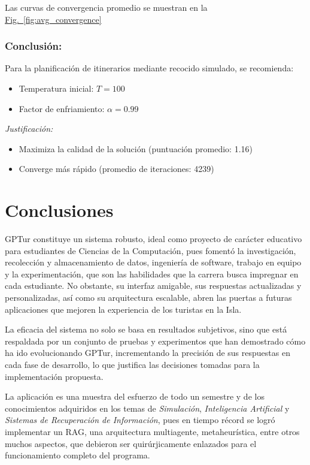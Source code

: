 \documentclass[10pt]{llncs}
\newcommand{\figref}[1]{\hyperref[#1]{Fig.~\ref*{#1}}}
\begin{document}
\begin{remark}
Las curvas de convergencia promedio se muestran en la {\figref{fig:avg_convergence}}
\end{remark}

\subsubsection{Conclusión:}
Para la planificación de itinerarios mediante recocido simulado, se recomienda:


\begin{itemize}
    \item Temperatura inicial: $T = 100$
    \item Factor de enfriamiento: $\alpha = 0.99$
\end{itemize}

\textit{Justificación:}
\begin{itemize}
    \item Maximiza la calidad de la solución (puntuación promedio: 1.16)
    \item Converge más rápido  (promedio de iteraciones: 4239)
\end{itemize}


\vspace{\baselineskip}
\section{Conclusiones}


GPTur constituye un sistema robusto, ideal como proyecto de carácter educativo para estudiantes de Ciencias de la Computación, pues fomentó 
la investigación, recolección y almacenamiento de datos, ingeniería de software, trabajo en equipo y la experimentación, que son las habilidades que la carrera busca impregnar en cada 
estudiante. No obstante, su interfaz amigable, sus respuestas actualizadas y personalizadas, así como su arquitectura escalable, abren las puertas a futuras aplicaciones que mejoren la experiencia de los turistas en la Isla.

La eficacia del sistema no solo se basa en resultados subjetivos, sino que está respaldada por un conjunto de pruebas y experimentos que han demostrado cómo ha ido evolucionando GPTur, incrementando la precisión de sus respuestas en cada fase 
de desarrollo, lo que justifica las decisiones tomadas para la implementación propuesta.

La aplicación es una muestra del esfuerzo de todo un semestre y de los conocimientos adquiridos en los temas de \textit{Simulación}, \textit{Inteligencia Artificial} y \textit{Sistemas de Recuperación de Información}, pues en tiempo récord se logró 
implementar un RAG, una arquitectura multiagente, metaheurística, entre otros muchos aspectos, que debieron ser quirúrjicamente enlazados para el funcionamiento completo del programa.
\end{document}
